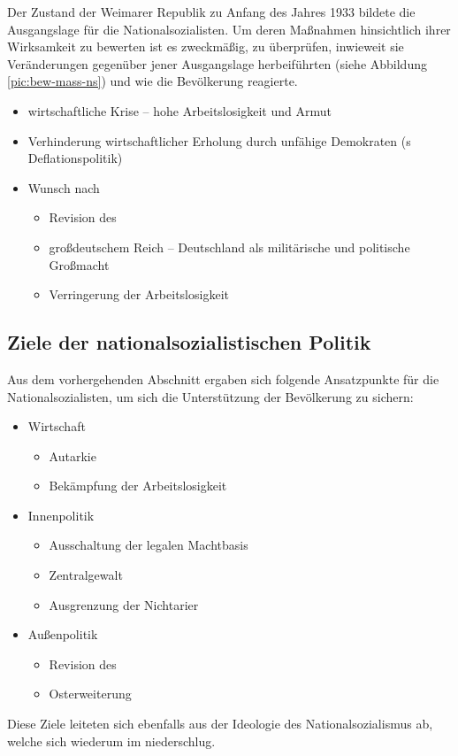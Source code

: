 Der Zustand der Weimarer Republik zu Anfang des Jahres 1933 bildete
die Ausgangslage für die Nationalsozialisten. Um deren Maßnahmen
hinsichtlich ihrer Wirksamkeit zu bewerten ist es zweckmäßig, zu
überprüfen, inwieweit sie Veränderungen gegenüber jener Ausgangslage
herbeiführten (siehe Abbildung \ref{pic:bew-mass-ns}) und wie die
Bevölkerung reagierte.

\begin{itemize}
\item wirtschaftliche Krise -- hohe Arbeitslosigkeit und Armut

\item Verhinderung wirtschaftlicher Erholung durch unfähige Demokraten
(s Deflationspolitik)

\item Wunsch nach
\begin{itemize}
\item Revision des 

\item großdeutschem Reich -- Deutschland als militärische und
politische Großmacht

\item Verringerung der Arbeitslosigkeit
\end{itemize} 
\end{itemize}


\subsection{Ziele der nationalsozialistischen Politik}

Aus dem vorhergehenden Abschnitt ergaben sich folgende Ansatzpunkte
für die Nationalsozialisten, um sich die Unterstützung der Bevölkerung
zu sichern:

\begin{itemize}
\item Wirtschaft
\begin{itemize}
\item Autarkie
\item Bekämpfung der Arbeitslosigkeit 
\end{itemize} 

\item Innenpolitik
\begin{itemize}
\item Ausschaltung der legalen Machtbasis
\item Zentralgewalt
\item Ausgrenzung der Nichtarier
\end{itemize}

\item Außenpolitik
\begin{itemize}
\item Revision des 
\item Osterweiterung
\end{itemize}
\end{itemize}

Diese Ziele leiteten sich ebenfalls aus der Ideologie des
Nationalsozialismus ab, welche sich wiederum im  niederschlug.

\endinput
